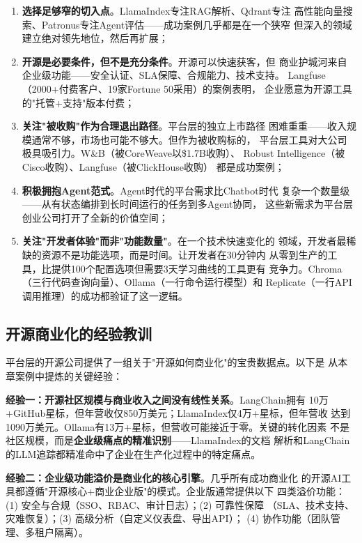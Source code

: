 \begin{enumerate}
  \item \textbf{选择足够窄的切入点}。LlamaIndex专注RAG解析、Qdrant专注
    高性能向量搜索、Patronus专注Agent评估——成功案例几乎都是在一个狭窄
    但深入的领域建立绝对领先地位，然后再扩展；

  \item \textbf{开源是必要条件，但不是充分条件}。开源可以快速获客，但
    商业护城河来自企业级功能——安全认证、SLA保障、合规能力、技术支持。
    Langfuse（2000+付费客户、19家Fortune 50采用）的案例表明，
    企业愿意为开源工具的"托管+支持"版本付费；

  \item \textbf{关注"被收购"作为合理退出路径}。平台层的独立上市路径
    困难重重——收入规模通常不够，市场也可能不够大。但作为被收购标的，
    平台层工具对大公司极具吸引力。W\&B（被CoreWeave以\$1.7B收购）、
    Robust Intelligence（被Cisco收购）、Langfuse（被ClickHouse收购）
    都是成功案例；

  \item \textbf{积极拥抱Agent范式}。Agent时代的平台需求比Chatbot时代
    复杂一个数量级——从有状态编排到长时间运行的任务到多Agent协同，
    这些新需求为平台层创业公司打开了全新的价值空间；

  \item \textbf{关注"开发者体验"而非"功能数量"}。在一个技术快速变化的
    领域，开发者最稀缺的资源不是功能选项，而是时间。让开发者在30分钟内
    从零到生产的工具，比提供100个配置选项但需要3天学习曲线的工具更有
    竞争力。Chroma（三行代码查询向量）、Ollama（一行命令运行模型）和
    Replicate（一行API调用推理）的成功都验证了这一逻辑。
\end{enumerate}

\subsection{开源商业化的经验教训}

平台层的开源公司提供了一组关于"开源如何商业化"的宝贵数据点。以下是
从本章案例中提炼的关键经验：

\textbf{经验一：开源社区规模与商业收入之间没有线性关系}。LangChain拥有
10万+GitHub星标，但年营收仅850万美元；LlamaIndex仅4万+星标，但年营收
达到1090万美元。Ollama有13万+星标，但营收可能接近于零。关键的转化因素
不是社区规模，而是\textbf{企业级痛点的精准识别}——LlamaIndex的文档
解析和LangChain的LLM追踪都精准命中了企业在生产化过程中的特定痛点。

\textbf{经验二：企业级功能溢价是商业化的核心引擎}。几乎所有成功商业化
的开源AI工具都遵循"开源核心+商业企业版"的模式。企业版通常提供以下
四类溢价功能：(1) 安全与合规（SSO、RBAC、审计日志）；(2) 可靠性保障
（SLA、技术支持、灾难恢复）；(3) 高级分析（自定义仪表盘、导出API）；
(4) 协作功能（团队管理、多租户隔离）。

